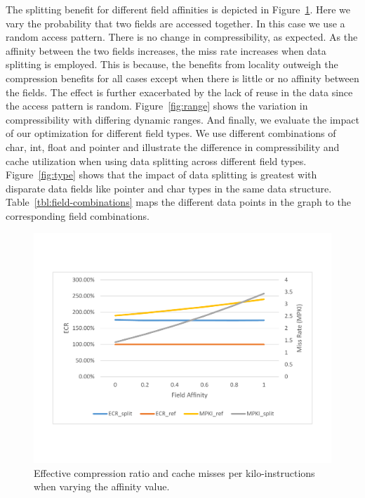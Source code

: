 The splitting benefit for different field affinities is depicted in
Figure~\ref{fig:affinity}.  Here we vary the probability that two fields are
accessed together. In this case we use a random access pattern. There is no
change in compressibility, as expected. As the affinity between the two fields
increases, the miss rate increases when data splitting is employed. This is
because, the benefits from locality outweigh the compression benefits for all
cases except when there is little or no affinity between the fields. The effect
is further exacerbated by the lack of reuse in the data since the access pattern
is random. Figure~\ref{fig:range} shows the variation in compressibility with
differing dynamic ranges. And finally, we evaluate the impact of our
optimization for different field types. We use different combinations of char,
int, float and pointer and illustrate the difference in compressibility and
cache utilization when using data splitting across different field types.
Figure~\ref{fig:type} shows that the impact of data splitting is greatest with
disparate data fields like pointer and char types in the same data structure.
Table~\ref{tbl:field-combinations} maps the different data points in the graph
to the corresponding field combinations. 

\begin{figure}[htb]
\centering
\includegraphics[trim=0mm 0mm 0mm 0mm,clip,width=1\linewidth]{figs/figure.pdf}
\caption{Effective compression ratio and cache misses per kilo-instructions when
varying the affinity value.}
\label{fig:affinity}
\end{figure}

